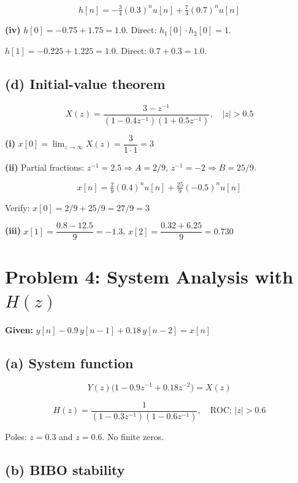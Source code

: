 \documentclass[11pt]{article}
\begin{document}
\begin{equation*}
\boxed{h[n] = -\tfrac{3}{4}(0.3)^n u[n] + \tfrac{7}{4}(0.7)^n u[n]}
\end{equation*}

\textbf{(iv)} $h[0] = -0.75 + 1.75 = 1.0$. Direct: $h_1[0] \cdot h_2[0] = 1$. \checkmark

$h[1] = -0.225 + 1.225 = 1.0$. Direct: $0.7 + 0.3 = 1.0$. \checkmark

\subsection*{(d) Initial-value theorem}

\[
X(z) = \frac{3 - z^{-1}}{(1 - 0.4z^{-1})(1 + 0.5z^{-1})}, \quad |z| > 0.5
\]

\textbf{(i)} $x[0] = \lim_{z\to\infty} X(z) = \dfrac{3}{1 \cdot 1} = 3$

\textbf{(ii)} Partial fractions: $z^{-1}=2.5 \Rightarrow A = 2/9$, \quad $z^{-1}=-2 \Rightarrow B = 25/9$.

\[
x[n] = \tfrac{2}{9}(0.4)^n u[n] + \tfrac{25}{9}(-0.5)^n u[n]
\]

Verify: $x[0] = 2/9 + 25/9 = 27/9 = 3$ \checkmark

\textbf{(iii)} $x[1] = \dfrac{0.8 - 12.5}{9} = -1.3$, \quad $x[2] = \dfrac{0.32 + 6.25}{9} = 0.730$

\section*{Problem 4: System Analysis with $H(z)$}

\textbf{Given:} $y[n] - 0.9\,y[n-1] + 0.18\,y[n-2] = x[n]$

\subsection*{(a) System function}

\[
Y(z)\bigl(1 - 0.9z^{-1} + 0.18z^{-2}\bigr) = X(z)
\]

\begin{equation*}
\boxed{H(z) = \frac{1}{(1 - 0.3z^{-1})(1 - 0.6z^{-1})}, \quad \text{ROC: } |z| > 0.6}
\end{equation*}

Poles: $z = 0.3$ and $z = 0.6$. No finite zeros.

\subsection*{(b) BIBO stability}
\end{document}
